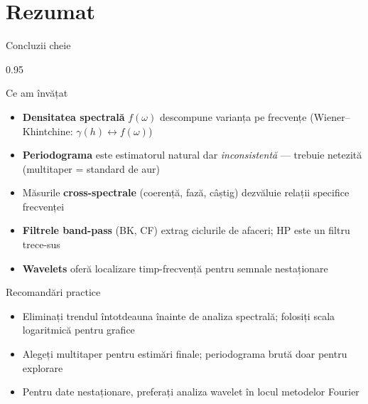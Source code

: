 \documentclass[9pt, aspectratio=169, t]{beamer}
\begin{document}
\section{Rezumat}

\begin{frame}{Concluzii cheie}
    \begin{cminipage}{0.95\textwidth}
    \vspace{-0.2cm}
    \begin{block}{Ce am învățat}
        {\small
        \begin{itemize}\setlength{\itemsep}{0pt}
            \item \textbf{Densitatea spectrală} $f(\omega)$ descompune varianța pe frecvențe (Wiener--Khintchine: $\gamma(h) \leftrightarrow f(\omega)$)
            \item \textbf{Periodograma} este estimatorul natural dar \textit{inconsistentă} --- trebuie netezită (multitaper = standard de aur)
            \item Măsurile \textbf{cross-spectrale} (coerență, fază, câștig) dezvăluie relații specifice frecvenței
            \item \textbf{Filtrele band-pass} (BK, CF) extrag ciclurile de afaceri; HP este un filtru trece-sus
            \item \textbf{Wavelets} oferă localizare timp-frecvență pentru semnale nestaționare
        \end{itemize}
        }
    \end{block}
    \vspace{-2mm}
    \begin{alertblock}{Recomandări practice}
        {\small
        \begin{itemize}\setlength{\itemsep}{0pt}
            \item Eliminați trendul întotdeauna înainte de analiza spectrală; folosiți scala logaritmică pentru grafice
            \item Alegeți multitaper pentru estimări finale; periodograma brută doar pentru explorare
            \item Pentru date nestaționare, preferați analiza wavelet în locul metodelor Fourier
        \end{itemize}
        }
    \end{alertblock}
    \end{cminipage}
\end{frame}
\end{document}
